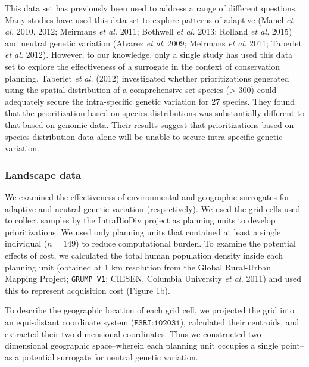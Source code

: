 \documentclass[11pt,]{article}
\begin{document}
This data set has previously been used to address a range of different
questions. Many studies have used this data set to explore patterns of
adaptive (Manel \emph{et al.} 2010, 2012; Meirmans \emph{et al.} 2011;
Bothwell \emph{et al.} 2013; Rolland \emph{et al.} 2015) and neutral
genetic variation (Alvarez \emph{et al.} 2009; Meirmans \emph{et al.}
2011; Taberlet \emph{et al.} 2012). However, to our knowledge, only a
single study has used this data set to explore the effectiveness of a
surrogate in the context of conservation planning. Taberlet \emph{et
al.} (2012) investigated whether prioritizations generated using the
spatial distribution of a comprehensive set species (\textgreater{} 300)
could adequately secure the intra-specific genetic variation for 27
species. They found that the prioritization based on species
distributions was substantially different to that based on genomic data.
Their results suggest that prioritizations based on species distribution
data alone will be unable to secure intra-specific genetic variation.

\subsubsection{Landscape data}\label{landscape-data}

We examined the effectiveness of environmental and geographic surrogates
for adaptive and neutral genetic variation (respectively). We used the
grid cells used to collect samples by the IntraBioDiv project as
planning units to develop prioritizations. We used only planning units
that contained at least a single individual (\(n = 149\)) to reduce
computational burden. To examine the potential effects of cost, we
calculated the total human population density inside each planning unit
(obtained at 1 km resolution from the Global Rural-Urban Mapping
Project; \texttt{GRUMP V1}; CIESEN, Columbia University \emph{et al.}
2011) and used this to represent acquisition cost (Figure 1b).

To describe the geographic location of each grid cell, we projected the
grid into an equi-distant coordinate system (\(\texttt{ESRI:102031}\)),
calculated their centroids, and extracted their two-dimensional
coordinates. Thus we constructed two-dimensional geographic
space--wherein each planning unit occupies a single point--as a
potential surrogate for neutral genetic variation.
\end{document}
